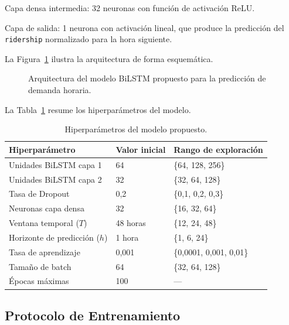 \documentclass[preprint,12pt]{elsarticle}
\begin{document}
Capa densa intermedia: 32 neuronas con función de activación ReLU.

Capa de salida: 1 neurona con activación lineal, que produce la predicción del \texttt{ridership} normalizado para la hora siguiente.

La Figura~\ref{fig:arquitectura} ilustra la arquitectura de forma esquemática.

\begin{figure}[htbp]
\centering
{}
\caption{Arquitectura del modelo BiLSTM propuesto para la predicción de demanda horaria.}
\label{fig:arquitectura}
\end{figure}

La Tabla~\ref{tab:hiperparametros} resume los hiperparámetros del modelo.

\begin{table}[htbp]
\centering
\caption{Hiperparámetros del modelo propuesto.}
\label{tab:hiperparametros}
\small
\begin{tabular}{p{4.5cm} p{3cm} p{4.5cm}}
\toprule
\textbf{Hiperparámetro} & \textbf{Valor inicial} & \textbf{Rango de exploración} \\
\midrule
Unidades BiLSTM capa 1 & 64 & \{64, 128, 256\} \\
Unidades BiLSTM capa 2 & 32 & \{32, 64, 128\} \\
Tasa de Dropout & 0,2 & \{0,1, 0,2, 0,3\} \\
Neuronas capa densa & 32 & \{16, 32, 64\} \\
Ventana temporal ($T$) & 48 horas & \{12, 24, 48\} \\
Horizonte de predicción ($h$) & 1 hora & \{1, 6, 24\} \\
Tasa de aprendizaje & 0,001 & \{0,0001, 0,001, 0,01\} \\
Tamaño de batch & 64 & \{32, 64, 128\} \\
Épocas máximas & 100 & --- \\
\bottomrule
\end{tabular}
\end{table}

\subsection{Protocolo de Entrenamiento}
\end{document}
